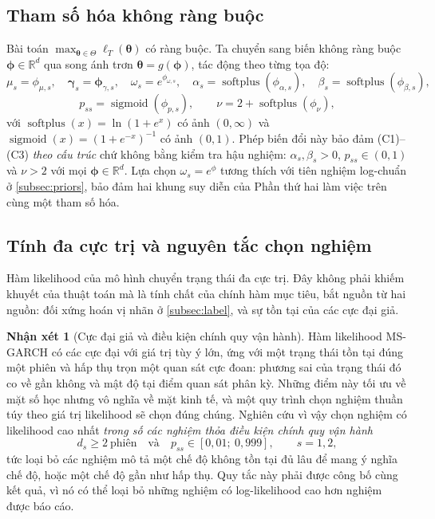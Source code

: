 \documentclass[12pt,a4paper]{article}
\numberwithin{equation}{section}
\theoremstyle{definition}
\newtheorem{remark}{Nhận xét}[section]
\newcommand{\R}{\mathbb{R}}
\newcommand{\softplus}{\operatorname{softplus}}
\newcommand{\sigmoid}{\operatorname{sigmoid}}
\newcommand{\Param}{\symbf{\theta}}
\newcommand{\bmgamma}{\symbf{\gamma}}
\newcommand{\vecphi}{\symbf{\phi}}
\begin{document}
\subsection{Tham số hóa không ràng buộc}\label{subsec:reparam}
Bài toán $\max_{\Param\in\Theta}\ell_T(\Param)$ có ràng buộc. Ta chuyển sang biến không
ràng buộc $\vecphi\in\R^{d}$ qua song ánh trơn $\Param=g(\vecphi)$, tác động theo từng
tọa độ:
\begin{equation}
  \mu_s=\phi_{\mu,s},\quad
  \bmgamma_s=\vecphi_{\gamma,s},\quad
  \omega_s=e^{\phi_{\omega,s}},\quad
  \alpha_s=\softplus(\phi_{\alpha,s}),\quad
  \beta_s=\softplus(\phi_{\beta,s}),
  \label{eq:transform-positive}
\end{equation}
\begin{equation}
  p_{ss}=\sigmoid(\phi_{p,s}),\qquad
  \nu=2+\softplus(\phi_{\nu}),
  \label{eq:transform-bounded}
\end{equation}
với $\softplus(x)=\ln(1+e^{x})$ có ảnh $(0,\infty)$ và $\sigmoid(x)=(1+e^{-x})^{-1}$ có
ảnh $(0,1)$. Phép biến đổi này bảo đảm (C1)--(C3) \emph{theo cấu trúc} chứ không bằng
kiểm tra hậu nghiệm: $\alpha_s,\beta_s>0$, $p_{ss}\in(0,1)$ và $\nu>2$ với mọi
$\vecphi\in\R^{d}$. Lựa chọn $\omega_s=e^{\phi}$ tương thích với tiên nghiệm log-chuẩn ở
\cref{subsec:priors}, bảo đảm hai khung suy diễn của Phần thứ hai làm việc trên cùng một
tham số hóa.

\subsection{Tính đa cực trị và nguyên tắc chọn nghiệm}\label{subsec:multimodality}
Hàm likelihood của mô hình chuyển trạng thái đa cực trị. Đây không phải khiếm khuyết của
thuật toán mà là tính chất của chính hàm mục tiêu, bắt nguồn từ hai nguồn: đối xứng hoán
vị nhãn ở \cref{subsec:label}, và sự tồn tại của các cực đại giả.

\begin{remark}[Cực đại giả và điều kiện chính quy vận hành]\label{rem:spurious}
Hàm likelihood MS-GARCH có các cực đại với giá trị tùy ý lớn, ứng với một trạng thái tồn
tại đúng một phiên và hấp thụ trọn một quan sát cực đoan: phương sai của trạng thái đó co
về gần không và mật độ tại điểm quan sát phân kỳ. Những điểm này tối ưu về mặt số học
nhưng vô nghĩa về mặt kinh tế, và một quy trình chọn nghiệm thuần túy theo giá trị
likelihood sẽ chọn đúng chúng. Nghiên cứu vì vậy chọn nghiệm có likelihood cao nhất
\emph{trong số các nghiệm thỏa điều kiện chính quy vận hành}
\begin{equation}
  d_s\ge 2\ \text{phiên}\quad\text{và}\quad p_{ss}\in[0{,}01;\ 0{,}999],
  \qquad s=1,2,
  \label{eq:regularity}
\end{equation}
tức loại bỏ các nghiệm mô tả một chế độ không tồn tại đủ lâu để mang ý nghĩa chế độ, hoặc
một chế độ gần như hấp thụ. Quy tắc này phải được công bố cùng kết quả, vì nó có thể loại
bỏ những nghiệm có log-likelihood cao hơn nghiệm được báo cáo.
\end{remark}
\end{document}
